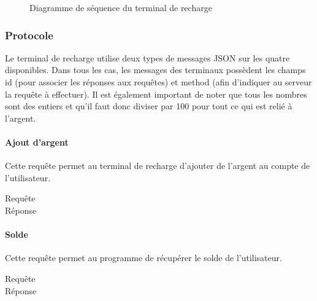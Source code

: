 		\begin{figure}[p]
			\centering
			
			\caption{Diagramme de séquence du terminal de recharge}
			\label{fig.rechseq}
		\end{figure}
		
		\subsubsection{Protocole}
		Le terminal de recharge utilise deux types de messages JSON sur les quatre disponibles. Dans tous les cas, les messages des terminaux possèdent les champs \og id \fg{} (pour associer les réponses aux requêtes) et \og method \fg{} (afin d’indiquer au serveur la requête à effectuer). Il est également important de noter que tous les nombres sont des entiers et qu’il faut donc diviser par 100 pour tout ce qui est relié à l’argent.
		
			\paragraph{Ajout d'argent} Cette requête permet au terminal de recharge d’ajouter de l’argent au compte de l’utilisateur.
			\begin{multicols}{2}	
				\begin{description}
					\item[Requête]  %
					
					\item[Réponse]  %
					
				\end{description}
			\end{multicols}
			
			\paragraph{Solde} Cette requête permet au programme de récupérer le solde de l’utilisateur.
			\begin{multicols}{2}
				\begin{description}
					\item[Requête]  %

					\item[Réponse]  %
					
				\end{description}
			\end{multicols}
			
